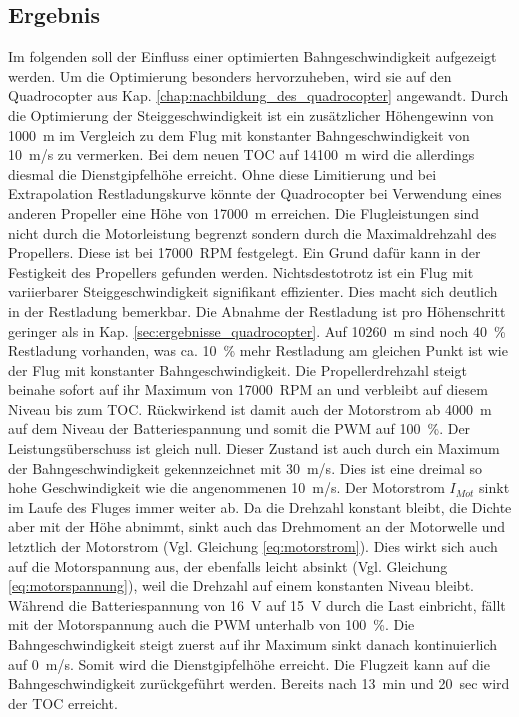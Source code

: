 \subsection{Ergebnis}
Im folgenden soll der Einfluss einer optimierten Bahngeschwindigkeit aufgezeigt werden. Um die Optimierung besonders hervorzuheben, wird sie auf den Quadrocopter aus Kap. \ref{chap:nachbildung_des_quadrocopter} angewandt. 
Durch die Optimierung der Steiggeschwindigkeit ist ein zusätzlicher Höhengewinn von \SI{1000}{m} im Vergleich zu dem Flug mit konstanter Bahngeschwindigkeit von \SI{10}{m/s} zu vermerken. Bei dem neuen TOC auf \SI{14100}{m} wird die allerdings diesmal die Dienstgipfelhöhe erreicht. Ohne diese Limitierung und bei Extrapolation Restladungskurve könnte der Quadrocopter bei Verwendung eines anderen Propeller eine Höhe von \SI{17000}{m} erreichen. Die Flugleistungen sind nicht durch die Motorleistung begrenzt sondern durch die Maximaldrehzahl des Propellers. Diese ist bei \SI{17000}{RPM} festgelegt. Ein Grund dafür kann in der Festigkeit des Propellers gefunden werden. Nichtsdestotrotz ist ein Flug mit variierbarer Steiggeschwindigkeit signifikant effizienter. Dies macht sich deutlich in der Restladung bemerkbar. Die Abnahme der Restladung ist pro Höhenschritt geringer als in Kap. \ref{sec:ergebnisse_quadrocopter}. Auf \SI{10260}{m} sind noch \SI{40}{\%} Restladung vorhanden, was ca. \SI{10}{\%} mehr Restladung am gleichen Punkt ist wie der Flug mit konstanter Bahngeschwindigkeit. Die Propellerdrehzahl steigt beinahe sofort auf ihr Maximum von \SI{17000}{RPM} an und verbleibt auf diesem Niveau bis zum TOC. Rückwirkend ist damit auch der Motorstrom ab \SI{4000}{m} auf dem Niveau der Batteriespannung und somit die PWM auf \SI{100}{\%}. Der Leistungsüberschuss ist gleich null. Dieser Zustand ist auch durch ein Maximum der Bahngeschwindigkeit gekennzeichnet mit \SI{30}{m/s}. Dies ist eine dreimal so hohe Geschwindigkeit wie die angenommenen \SI{10}{m/s}. Der Motorstrom \ensuremath{I_{Mot}} sinkt im Laufe des Fluges immer weiter ab. Da die Drehzahl konstant bleibt, die Dichte aber mit der Höhe abnimmt, sinkt auch das Drehmoment an der Motorwelle und letztlich der Motorstrom (Vgl. Gleichung \ref{eq:motorstrom}). Dies wirkt sich auch auf die Motorspannung aus, der ebenfalls leicht absinkt (Vgl. Gleichung \ref{eq:motorspannung}), weil die Drehzahl auf einem konstanten Niveau bleibt. Während die Batteriespannung von \SI{16}{V} auf \SI{15}{V} durch die Last einbricht, fällt mit der Motorspannung auch die PWM unterhalb von \SI{100}{\%}. Die Bahngeschwindigkeit steigt zuerst auf ihr Maximum  sinkt danach kontinuierlich auf \SI{0}{m/s}. Somit wird die Dienstgipfelhöhe erreicht. Die Flugzeit kann auf die Bahngeschwindigkeit zurückgeführt werden. Bereits nach \SI{13}{min} und \SI{20}{sec} wird der TOC erreicht. \\
